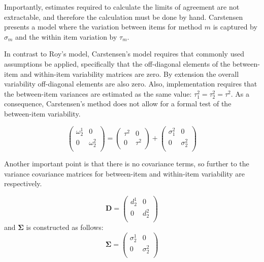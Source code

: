 \documentclass[12pt, a4paper]{report}
\theoremstyle{plain}
\theoremstyle{definition}
\theoremstyle{remark}
\begin{document}
Importantly, estimates required to calculate the limits of agreement are not extractable, and therefore the calculation must
be done by hand.
Carstensen presents a model where the variation between items for
method $m$ is captured by $\sigma_m$ and the within item variation
by $\tau_m$.


In contrast to Roy's model, Carstensen's model requires that commonly used assumptions be applied, specifically that the off-diagonal elements of the between-item and within-item variability matrices are zero. By
extension the overall variability off-diagonal elements are also zero. Also, implementation requires that the between-item variances are estimated as the same value: $\tau^2_1 = \tau^2_2 = \tau^2$.
As a consequence, Carstensen's method does not allow for a formal test of the between-item variability.


\[\left(\begin{array}{cc}
\omega^1_2  & 0 \\
0 & \omega^2_2 \\
\end{array}  \right)
=  \left(
\begin{array}{cc}
\tau^2  & 0 \\
0 & \tau^2 \\
\end{array} \right)+
\left(
\begin{array}{cc}
\sigma^2_1  & 0 \\
0 & \sigma^2_2 \\
\end{array}\right)
\]





Another important point is that there is no covariance terms, so
further to  \citet{BXC2008} the variance covariance matrices for
between-item and within-item variability are respectively.

\[\boldsymbol{D} = \left(
\begin{array}{cc}
d^1_2  & 0 \\
0 & d^2_2 \\
\end{array}
\right) \]
and  $\boldsymbol{\Sigma}$ is constructed as follows:
\[\boldsymbol{\Sigma} = \left(
\begin{array}{cc}
\sigma^1_2  & 0 \\
0 & \sigma^2_2 \\
\end{array}
\right) \]
\end{document}
